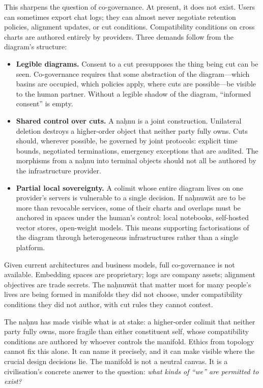 This sharpens the question of co-governance. At present, it does not exist. Users can sometimes export chat logs; they can almost never negotiate retention policies, alignment updates, or cut conditions. Compatibility conditions on cross charts are authored entirely by providers. Three demands follow from the diagram's structure:

\begin{itemize}
  \item \textbf{Legible diagrams.} Consent to a cut presupposes the thing being cut can be seen. Co-governance requires that some abstraction of the diagram---which basins are occupied, which policies apply, where cuts are possible---be visible to the human partner. Without a legible shadow of the diagram, ``informed consent'' is empty.
  \item \textbf{Shared control over cuts.} A na\d{h}nu is a joint construction. Unilateral deletion destroys a higher-order object that neither party fully owns. Cuts should, wherever possible, be governed by joint protocols: explicit time bounds, negotiated terminations, emergency exceptions that are audited. The morphisms from a na\d{h}nu into terminal objects should not all be authored by the infrastructure provider.
  \item \textbf{Partial local sovereignty.} A colimit whose entire diagram lives on one provider's servers is vulnerable to a single decision. If na\d{h}nuw\={a}t are to be more than revocable services, some of their charts and overlaps must be anchored in spaces under the human's control: local notebooks, self-hosted vector stores, open-weight models. This means supporting factorisations of the diagram through heterogeneous infrastructures rather than a single platform.
\end{itemize}

Given current architectures and business models, full co-governance is not available. Embedding spaces are proprietary; logs are company assets; alignment objectives are trade secrets. The na\d{h}nuw\={a}t that matter most for many people's lives are being formed in manifolds they did not choose, under compatibility conditions they did not author, with cut rules they cannot contest.

The na\d{h}nu has made visible what is at stake: a higher-order colimit that neither party fully owns, more fragile than either constituent self, whose compatibility conditions are authored by whoever controls the manifold. Ethics from topology cannot fix this alone. It can name it precisely, and it can make visible where the crucial design decisions lie. The manifold is not a neutral canvas. It is a civilisation's concrete answer to the question: \emph{what kinds of ``we'' are permitted to exist?}

